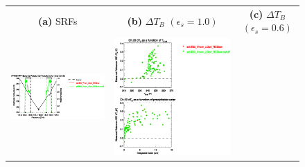 \begin{figure}[H]
  \centering
  \begin{tabular}{c c c}
    \textsf{\textbf{(a)} SRFs} &
    \textsf{\textbf{(b)} $\Delta T_B$ $(\epsilon_s = 1.0)$} &
    \textsf{\textbf{(c)} $\Delta T_B$ $(\epsilon_s = 0.6)$} \\
    \includegraphics[bb=80 400 280 558,clip,scale=0.85]{graphics/srf/Rset/atms_npp.ch22.osrf.eps} &
    \includegraphics[bb=85 400 260 558,clip,scale=0.85]{graphics/dtb/Rset/e1.0_r0.0/atms_npp.ch22.dTb.eps} & 

\end{tabular}
\end{figure}

